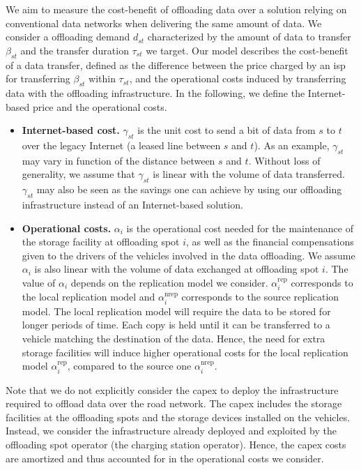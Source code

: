 We aim to measure the cost-benefit of offloading data over a solution relying on conventional data networks when delivering the same amount of data. We consider a offloading demand $d_{st}$ characterized by the amount of data to transfer $\beta_{st}$ and the transfer duration $\tau_{st}$ we target. Our model describes the cost-benefit of a data transfer, defined as the difference between the price charged by an \acrfull{isp} for transferring $\beta_{st}$ within $\tau_{st}$, and the operational costs induced by transferring data with the offloading infrastructure. In the following, we define the Internet-based price and the operational costs.

\begin{itemize}
	
	\item \textbf{Internet-based cost.} $\gamma_{st}$ is the unit cost to send a bit of data from $s$ to $t$ over the legacy Internet (\eg a leased line between $s$ and $t$). As an example, $\gamma_{st}$ may vary in function of the distance between $s$ and $t$. Without loss of generality, we assume that $\gamma_{st}$ is linear with the volume of data transferred. $\gamma_{st}$ may also be seen as the savings one can achieve by using our offloading infrastructure instead of an Internet-based solution.
	
	\item \textbf{Operational costs.} $\alpha_{i}$ is the operational cost needed for the maintenance of the storage facility at offloading spot $i$, as well as the financial compensations given to the drivers of the vehicles involved in the data offloading. We assume $\alpha_{i}$ is also linear with the volume of data exchanged at offloading spot $i$. The value of $\alpha_{i}$ depends on the replication model we consider. $\alpha^{\text{rep}}_{i}$ corresponds to the local replication model and $\alpha^{\text{nrep}}_{i}$ corresponds to the source replication model. The local replication model will require the data to be stored for longer periods of time. Each copy is held until it can be transferred to a vehicle matching the destination of the data. Hence, the need for extra storage facilities will induce higher operational costs for the local replication model $\alpha^{\text{rep}}_{i}$, compared to the source one $\alpha^{\text{nrep}}_{i}$.
	
\end{itemize}

Note that we do not explicitly consider the \acrfull{capex} to deploy the infrastructure required to offload data over the road network. The \acrshort{capex} includes the storage facilities at the offloading spots and the storage devices installed on the vehicles. Instead, we consider the infrastructure already deployed and exploited by the offloading spot operator (\eg the charging station operator). Hence, the \acrshort{capex} costs are amortized and thus accounted for in the operational costs we consider.

